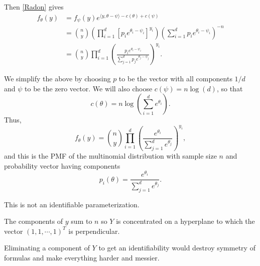 \documentclass[
  ignorenonframetext,
]{beamer}
\begin{document}
\begin{frame}{}
\protect\hypertarget{section-6}{}
Then \eqref{Radon} gives \begin{align*}
  f_{\theta}(y) &= f_{\psi}(y)e^{\langle y,\theta-\psi\rangle - c(\theta) + c(\psi)} \\
    &= {n \choose y} \left(\prod_{i=1}^d\left[p_ie^{\theta_i-\psi_i}\right]^{y_i}\right)\left(\sum_{i=1}^d p_ie^{\theta_i-\psi_i}\right)^{-n} \\
    &= {n \choose y} \prod_{i=1}^d \left(\frac{p_ie^{\theta_i-\psi_i}}{\sum_{j=1}^dp_je^{\theta_j-\psi_j}}\right)^{y_i}.
\end{align*}
\end{frame}

\begin{frame}{}
\protect\hypertarget{section-7}{}
We simplify the above by choosing \(p\) to be the vector with all
components \(1/d\) and \(\psi\) to be the zero vector. We will also
choose \(c(\psi) = n\log(d)\), so that \[
  c(\theta) = n\log\left(\sum_{i=1}^d e^{\theta_i}\right).
\] Thus, \[
  f_{\theta}(y) = {n \choose y}\prod_{i=1}^d \left(\frac{e^{\theta_i}}{\sum_{j=1}^d e^{\theta_j}}\right)^{y_i},
\] and this is the PMF of the multinomial distribution with sample size
\(n\) and probability vector having components \[
  p_i(\theta) = \frac{e^{\theta_i}}{\sum_{j=1}^d e^{\theta_j}}.
\]
\end{frame}

\begin{frame}{}
\protect\hypertarget{section-8}{}
This is not an identifiable parameterization.

The components of \(y\) sum to \(n\) so \(Y\) is concentrated on a
hyperplane to which the vector \((1,1, \cdots, 1)^T\) is perpendicular.

Eliminating a component of \(Y\) to get an identifiability would destroy
symmetry of formulas and make everything harder and messier.
\end{frame}
\end{document}

